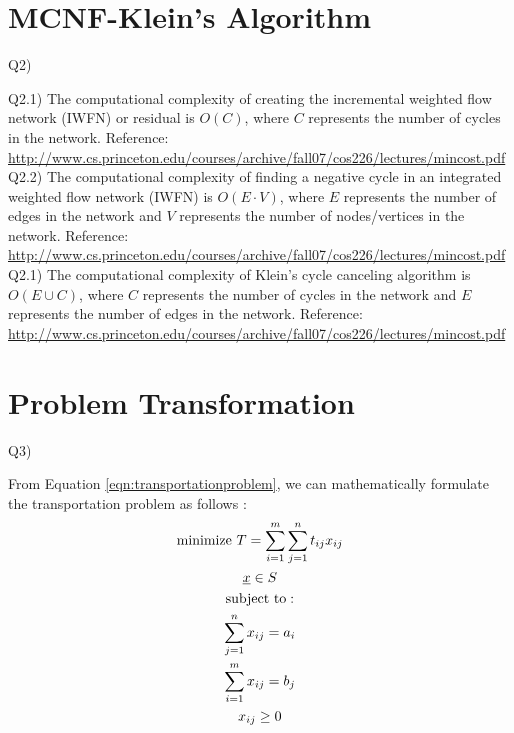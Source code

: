 \documentclass[letter,12pt]{article}
\begin{document}
\section{MCNF-Klein's Algorithm}
\label{sec:kleinalgor}

Q2)

Q2.1) The computational complexity of creating the incremental weighted flow network (IWFN) or residual is $O(C)$, where $C$ represents the number of cycles in the network. Reference: \url{http://www.cs.princeton.edu/courses/archive/fall07/cos226/lectures/mincost.pdf} \\

Q2.2) The computational complexity of finding a negative cycle in an integrated weighted flow network (IWFN) is $O(E \cdot V)$, where $E$ represents the number of edges in the network and $V$ represents the number of nodes/vertices in the network. Reference: \url{http://www.cs.princeton.edu/courses/archive/fall07/cos226/lectures/mincost.pdf} \\

Q2.1) The computational complexity of Klein's cycle canceling algorithm is $O(E \cup C)$, where $C$ represents the number of cycles in the network and $E$ represents the number of edges in the network. Reference: \url{http://www.cs.princeton.edu/courses/archive/fall07/cos226/lectures/mincost.pdf} \\




\section{Problem Transformation}
\label{sec:problemtransformation}

Q3)

From Equation \ref{eqn:transportationproblem}, we can mathematically formulate the transportation problem as follows \cite[\S8.4, pp.439--447]{Miller2000}:
\begin{eqnarray}
	\begin{gathered}[b]
	{\rm minimize}\ T = \displaystyle\sum^{m}_{i = 1} \displaystyle\sum^{n}_{j = 1} t_{ij}x_{ij} \\
	\underline{x} \in S \\
	{\rm subject\ to:} \\
	\displaystyle\sum^{n}_{j = 1} x_{ij} = a_{i} \\
	\displaystyle\sum^{m}_{i = 1} x_{ij} = b_{j} \\
	x_{ij} \geq 0
	\end{gathered}
\end{eqnarray}
\end{document}
